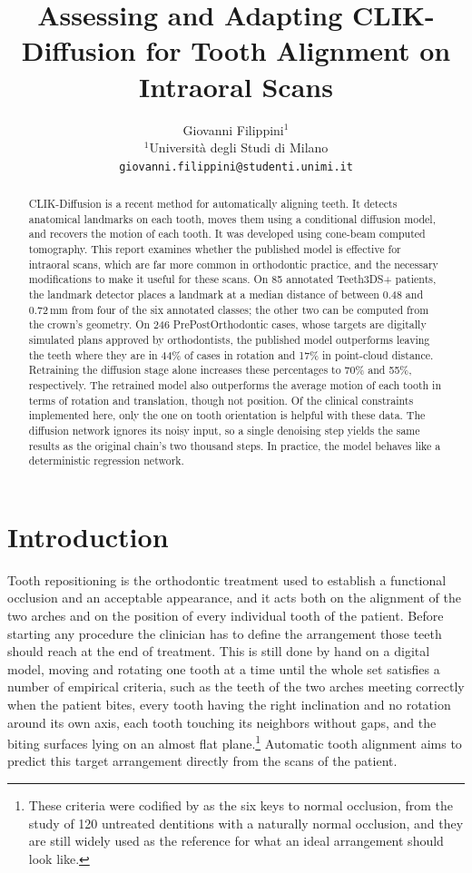 \documentclass[10pt,a4paper]{article}
\title{\textbf{Assessing and Adapting CLIK-Diffusion for Tooth Alignment on Intraoral Scans}}
\author{Giovanni Filippini$^1$\vspace{1.5mm} \\
{\small $^1$Università degli Studi di Milano} \\
    {\small \texttt{giovanni.filippini@studenti.unimi.it}}
}
\date{}
\begin{document}
\maketitle

\begin{abstract}
CLIK-Diffusion is a recent method for automatically aligning teeth. It detects anatomical landmarks on each tooth, moves them using a conditional diffusion model, and recovers the motion of each tooth. It was developed using cone-beam computed tomography. This report examines whether the published model is effective for intraoral scans, which are far more common in orthodontic practice, and the necessary modifications to make it useful for these scans. On 85 annotated Teeth3DS+ patients, the landmark detector places a landmark at a median distance of between 0.48 and 0.72\,mm from four of the six annotated classes; the other two can be computed from the crown's geometry. On 246 PrePostOrthodontic cases, whose targets are digitally simulated plans approved by orthodontists, the published model outperforms leaving the teeth where they are in 44\% of cases in rotation and 17\% in point-cloud distance. Retraining the diffusion stage alone increases these percentages to 70\% and 55\%, respectively. The retrained model also outperforms the average motion of each tooth in terms of rotation and translation, though not position. Of the clinical constraints implemented here, only the one on tooth orientation is helpful with these data. The diffusion network ignores its noisy input, so a single denoising step yields the same results as the original chain's two thousand steps. In practice, the model behaves like a deterministic regression network.
\end{abstract}


\section{Introduction}

Tooth repositioning is the orthodontic treatment used to establish a functional occlusion and an acceptable appearance, and it acts both on the alignment of the two arches and on the position of every individual tooth of the patient. Before starting any procedure the clinician has to define the arrangement those teeth should reach at the end of treatment. This is still done by hand on a digital model, moving and rotating one tooth at a time until the whole set satisfies a number of empirical criteria, such as the teeth of the two arches meeting correctly when the patient bites, every tooth having the right inclination and no rotation around its own axis, each tooth touching its neighbors without gaps, and the biting surfaces lying on an almost flat plane.\footnote{These criteria were codified by \citet{andrews1972} as the six keys to normal occlusion, from the study of 120 untreated dentitions with a naturally normal occlusion, and they are still widely used as the reference for what an ideal arrangement should look like.} Automatic tooth alignment aims to predict this target arrangement directly from the scans of the patient.
\end{document}
